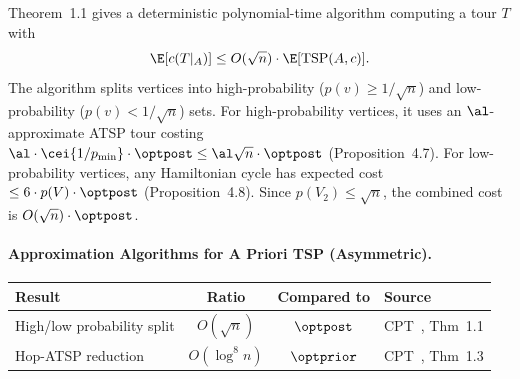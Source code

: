 \begin{remark}
    Theorem~1.1 gives a deterministic polynomial-time algorithm computing a tour $T$ with
    \[
        \E[c(T|_A)] \le O(\sqrt{n}) \cdot \E[\text{TSP}(A, c)].
    \]
    The algorithm splits vertices into high-probability
    ($p(v) \ge 1/\sqrt{n}$) and low-probability
    ($p(v) < 1/\sqrt{n}$) sets.
    For high-probability vertices, it uses an $\al$-approximate ATSP tour
    costing
    $\al \cdot \cei{1/p_{\min}} \cdot \optpost \le \al\sqrt{n} \cdot \optpost$
    (Proposition~4.7).
    For low-probability vertices, any Hamiltonian cycle has expected cost
    $\le 6 \cdot p(V) \cdot \optpost$ (Proposition~4.8).
    Since $p(V_2) \le \sqrt{n}$, the combined cost is
    $O(\sqrt{n}) \cdot \optpost$.
\end{remark}

\paragraph{Approximation Algorithms for A Priori TSP (Asymmetric).}

\begin{center}
\renewcommand{\arraystretch}{1.4}
\begin{tabular}{l c c l}
    \hline
    \textbf{Result} & \textbf{Ratio} & \textbf{Compared to} & \textbf{Source} \\
    \hline
    High/low probability split & $O(\sqrt{n})$ & $\optpost$ & CPT~\cite{Christalla2025}, Thm~1.1 \\
    Hop-ATSP reduction & $O(\log^8 n)$ & $\optprior$ & CPT~\cite{Christalla2025}, Thm~1.3 \\
    \hline
\end{tabular}
\end{center}

